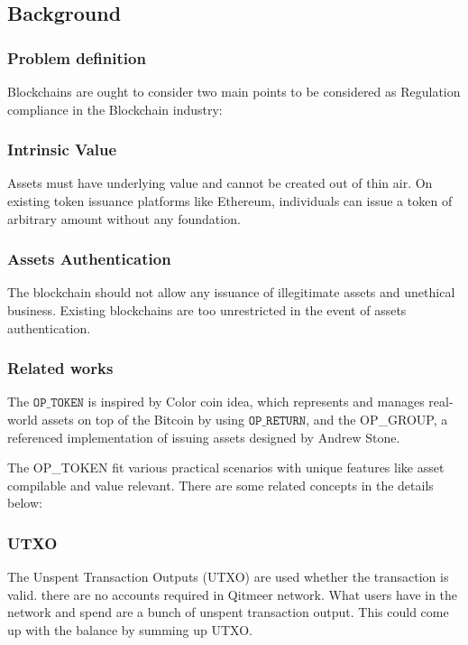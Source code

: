 \documentclass[a4paper,11pt]{article}
\begin{document}
\subsection{Background}
\subsubsection{Problem definition}

Blockchains are ought to consider two main points to be considered as Regulation compliance in the Blockchain industry:

\subsubsection*{Intrinsic Value}
Assets must have underlying value and cannot be created out of thin air. On existing token issuance platforms like Ethereum\cite{Ethereum}, individuals can issue a token of arbitrary amount without any foundation.
 

\subsubsection*{Assets Authentication}
The blockchain should not allow any issuance of illegitimate assets and unethical business. Existing blockchains are too unrestricted in the event of assets authentication.

\subsubsection{Related works}

The $\texttt{OP\_TOKEN}$ is inspired by Color coin idea, which represents and manages real-world assets on top of the Bitcoin by using $\texttt{OP\_RETURN}$, and the OP\_GROUP, a referenced implementation of issuing assets designed by Andrew Stone.

The OP\_TOKEN fit various practical scenarios with unique features like asset compilable and value relevant. There are some related concepts in the details below:

\subsubsection*{UTXO}

The Unspent Transaction Outputs (UTXO) are used whether the transaction is valid. there are no accounts required in Qitmeer network. What users have in the network and spend are a bunch of unspent transaction output. This could come up with the balance by summing up UTXO.
\end{document}

